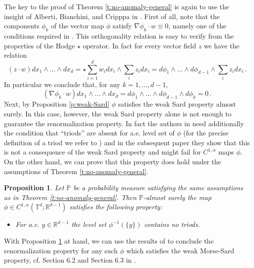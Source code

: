\documentclass[11pt,reqno]{amsart}
\newtheorem{proposition}[theorem]{Proposition}
\theoremstyle{definition}
\numberwithin{equation}{section}
\begin{document}
The key to the proof of Theorem \ref{t:no-anomaly-general} is again to use the insight of Alberti, Bianchini, and Cripppa in \cite{AlbertiBianchiniCrippa2014}. First of all, note that the components $\phi_k$ of the vector map $\phi$ satisfy $\nabla \phi_k \cdot w \equiv 0$, namely one of the conditions required in \cite[Section 6.2]{AlbertiBianchiniCrippa2014}. This orthogonality relation is easy to verify from the properties of the Hodge $\star$ operator. In fact for every vector field $z$ we have the relation
\[
(z\cdot w) dx_1 \wedge \ldots \wedge dx_d = \star \sum_{i=1}^d  w_i dx_i \wedge \sum_i z_i dx_i = d\phi_1 \wedge \ldots \wedge d\phi_{d-1} \wedge \sum_i z_i dx_i\, .
\]
In particular we conclude that, for any $k = 1, \ldots, d - 1$,
\[
(\nabla \phi_k \cdot w) dx_1 \wedge \ldots \wedge dx_d = d\phi_1 \wedge \ldots \wedge d\phi_{d-1}\wedge d\phi_k = 0\, .
\]
Next, by Proposition \ref{p:weak-Sard} $\phi$ satisfies the weak Sard property almost surely. In this case, however, the weak Sard property alone is not enough to guarantee the renormalization property. In fact the authors in \cite{AlbertiBianchiniCrippa2014} need additionally the condition that ``triods'' are absent for a.e. level set of $\phi$ (for the precise definition of a triod we refer to \cite[Section 2.3]{ABC-2}) and in the subsequent paper \cite{ABC-2} they show that this is not a consequence of the weak Sard property and might fail for $C^{1,\alpha}$ maps $\phi$. On the other hand, we can prove that this property does hold under the assumptions of Theorem \ref{t:no-anomaly-general}. 

\begin{proposition}\label{p:no-triods}
Let $\mathbb P$ be a probability measure satisfying the same assumptions as in Theorem \ref{t:no-anomaly-general}. Then $\mathbb P$-almost surely the map $\phi \in C^{1,\alpha} (\mathbb{T}^d ; \mathbb{R}^{d-1})$ satisfies the following property:
\begin{itemize}
\item[(NT)] For a.e. $y\in \mathbb R^{d-1}$ the level set $\phi^{-1} (\{y\})$ contains no triods.
\end{itemize}
\end{proposition}

With Proposition \ref{p:no-triods} at hand, we can use the results of \cite{AlbertiBianchiniCrippa2014} to conclude the renormalization property for any such $\phi$ which satisfies the weak Morse-Sard property, cf. Section 6.2 and Section 6.3 in \cite{AlbertiBianchiniCrippa2014}. 
\end{document}
